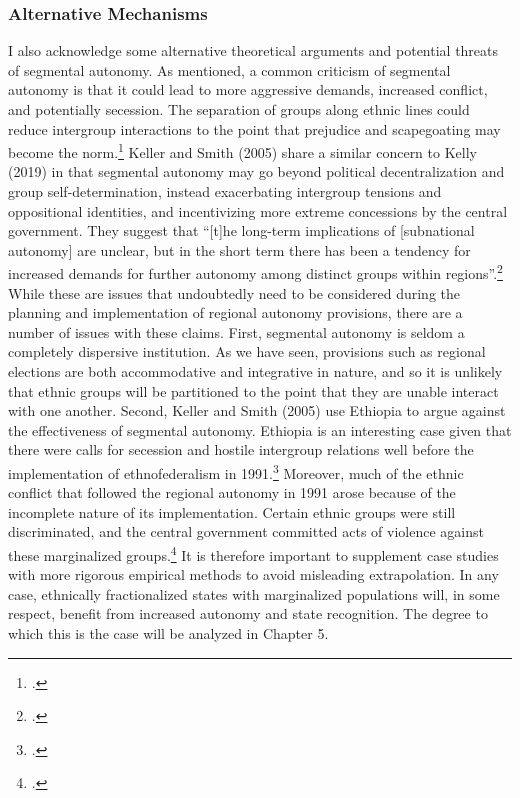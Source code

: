 \documentclass[12pt]{article}
\begin{document}
\subsubsection{Alternative Mechanisms}
I also acknowledge some alternative theoretical arguments and potential threats of segmental autonomy. As mentioned, a common criticism of segmental autonomy is that it could lead to more aggressive demands, increased conflict, and potentially secession. The separation of groups along ethnic lines could reduce intergroup interactions to the point that prejudice and scapegoating may become the norm.\footcite{kelly_power-sharing_2019} Keller and Smith (2005) share a similar concern to Kelly (2019) in that segmental autonomy may go beyond political decentralization and group self-determination, instead exacerbating intergroup tensions and oppositional identities, and incentivizing more extreme concessions by the central government. They suggest that ``[t]he long-term implications of [subnational autonomy] are unclear, but in the short term there has been a tendency for increased demands for further autonomy among distinct groups within regions''.\footcite[240]{keller_obstacle_2005} While these are issues that undoubtedly need to be considered during the planning and implementation of regional autonomy provisions, there are a number of issues with these claims. First, segmental autonomy is seldom a completely dispersive institution. As we have seen, provisions such as regional elections are both accommodative and integrative in nature, and so it is unlikely that ethnic groups will be partitioned to the point that they are unable interact with one another. Second, Keller and Smith (2005) use Ethiopia to argue against the effectiveness of segmental autonomy. Ethiopia is an interesting case given that there were calls for secession and hostile intergroup relations well before the implementation of ethnofederalism in 1991.\footcite{vogt_integrating_2015} Moreover, much of the ethnic conflict that followed the regional autonomy in 1991 arose because of the incomplete nature of its implementation. Certain ethnic groups were still discriminated, and the central government committed acts of violence against these marginalized groups.\footcite{vogt_integrating_2015} It is therefore important to supplement case studies with more rigorous empirical methods to avoid misleading extrapolation. In any case, ethnically fractionalized states with marginalized populations will, in some respect, benefit from increased autonomy and state recognition. The degree to which this is the case will be analyzed in Chapter 5.
\end{document}
